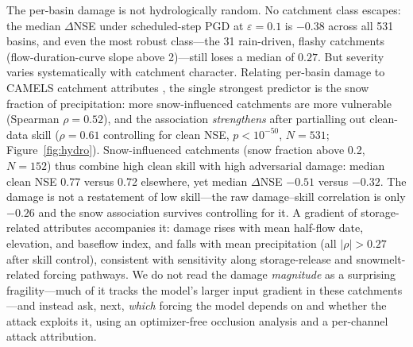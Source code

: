 \documentclass[final]{agujournal2019}
\begin{document}
The per-basin damage is not hydrologically random. No catchment class escapes: the median $\Delta$NSE under scheduled-step PGD at $\varepsilon = 0.1$ is $-0.38$ across all 531 basins, and even the most robust class---the 31 rain-driven, flashy catchments (flow-duration-curve slope above 2)---still loses a median of $0.27$. But severity varies systematically with catchment character. Relating per-basin damage to CAMELS catchment attributes \cite{Addor2017}, the single strongest predictor is the snow fraction of precipitation: more snow-influenced catchments are more vulnerable (Spearman $\rho = 0.52$), and the association \emph{strengthens} after partialling out clean-data skill ($\rho = 0.61$ controlling for clean NSE, $p < 10^{-50}$, $N = 531$; Figure~\ref{fig:hydro}). Snow-influenced catchments (snow fraction above 0.2, $N = 152$) thus combine high clean skill with high adversarial damage: median clean NSE 0.77 versus 0.72 elsewhere, yet median $\Delta$NSE $-0.51$ versus $-0.32$. The damage is not a restatement of low skill---the raw damage--skill correlation is only $-0.26$ and the snow association survives controlling for it. A gradient of storage-related attributes accompanies it: damage rises with mean half-flow date, elevation, and baseflow index, and falls with mean precipitation (all $|\rho| > 0.27$ after skill control), consistent with sensitivity along storage-release and snowmelt-related forcing pathways. We do not read the damage \emph{magnitude} as a surprising fragility---much of it tracks the model's larger input gradient in these catchments---and instead ask, next, \emph{which} forcing the model depends on and whether the attack exploits it, using an optimizer-free occlusion analysis and a per-channel attack attribution.
\end{document}
